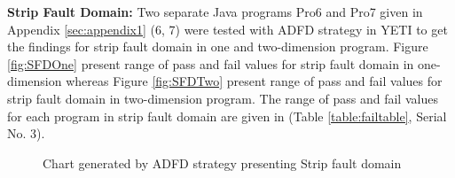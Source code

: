 




\noindent \textbf{Strip Fault Domain:} Two separate Java programs Pro6 and Pro7 given in Appendix \ref{sec:appendix1} (6, 7) were tested with ADFD strategy in YETI to get the findings for strip fault domain in one and two-dimension program. Figure \ref{fig:SFDOne} present range of pass and fail values for strip fault domain in one-dimension whereas Figure \ref{fig:SFDTwo} present range of pass and fail values for strip fault domain in two-dimension program. The range of pass and fail values for each program in strip fault domain are given in (Table \ref{table:failtable}, Serial No. 3).


%
\begin{figure} [H]
\centering
{}

\caption{Chart generated by ADFD strategy presenting Strip fault domain}
\end{figure}






